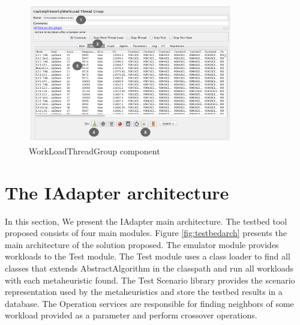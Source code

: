 \documentclass[espaco=umemeio,chapter=TITLE,twoside,openright]{abnt}
\begin{document}
\begin{figure}[h]
\centering
\includegraphics[width=0.8\textwidth]{./images/tela1iadapter.png}
\caption{WorkLoadThreadGroup component}
\label{fig:tela1iadapter}
\end{figure}

\vspace*{-.075in}
\section{The IAdapter architecture}
\label{sec:technique}
\vspace*{-.075in}


In this section, We present the IAdapter main architecture. The testbed tool proposed consists of four main modules.  Figure \ref{fig:testbedarch} presents the main architecture of the solution proposed. The emulator module provides workloads to the Test module. The Test module uses a class loader to find all classes that extends AbstractAlgorithm in the classpath and run all workloads with each metaheuristic found. The Test Scenario library provides the scenario representation used by the metaheuristics and store the testbed results in a database. The Operation services are responsible for finding neighbors of some workload provided as a parameter and perform crossover operations.
\end{document}
